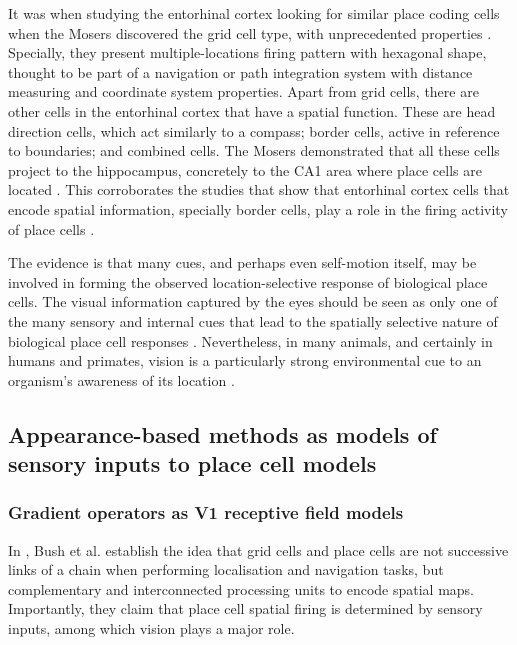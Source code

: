 It was when studying the entorhinal cortex looking for similar place coding cells when the Mosers discovered the grid cell type, with unprecedented properties \cite{hafting2005microstructure}. Specially, they present multiple-locations firing pattern with hexagonal shape, thought to be part of a navigation or path integration system with distance measuring and coordinate system properties. Apart from grid cells, there are other cells in the entorhinal cortex that have a spatial function. These are head direction cells, which act similarly to a compass; border cells, active in reference to boundaries; and combined cells. The Mosers demonstrated that all these cells project to the hippocampus, concretely to the CA1 area where place cells are located \cite{zhang2013optogenetic}. This corroborates the studies that show that entorhinal cortex cells that encode spatial information, specially	 border cells, play a role in the firing activity of place cells \cite{bush2014grid}.

The evidence is that many cues, and perhaps even self-motion itself, may be involved in forming the observed location-selective response of biological place cells.  The visual information captured by the eyes should be seen as only one of the many sensory and internal cues that lead to the spatially selective nature of biological place cell responses \cite{hassabis2009decoding}. Nevertheless, in many animals, and certainly in humans and primates, vision is a particularly strong environmental cue to an organism's awareness of its location \cite{epstein1998cortical}.


\subsection{Appearance-based methods as models of sensory inputs to place cell models}

\subsubsection{Gradient operators as V1 receptive field models}

In \cite{bush2014grid}, Bush et al. establish the idea that grid cells and place cells are not successive links of a chain when performing localisation and navigation tasks, but complementary and interconnected processing units to encode spatial maps. Importantly, they claim that place cell spatial firing is determined by sensory inputs, among which vision plays a major role.

